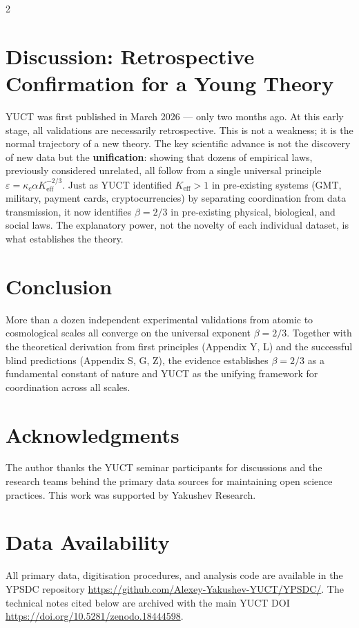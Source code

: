 \documentclass[11pt,a4paper]{article}
\newcommand{\betaf}{\beta}
\begin{document}
\begin{multicols}{2}
		\section{Discussion: Retrospective Confirmation for a Young Theory}
		
		YUCT was first published in March 2026 — only two months ago. At this early stage, all validations are necessarily retrospective. This is not a weakness; it is the normal trajectory of a new theory. The key scientific advance is not the discovery of new data but the \textbf{unification}: showing that dozens of empirical laws, previously considered unrelated, all follow from a single universal principle \(\varepsilon = \kappa_c \alpha K_{\mathrm{eff}}^{-2/3}\). Just as YUCT identified \(K_{\mathrm{eff}} > 1\) in pre‑existing systems (GMT, military, payment cards, cryptocurrencies) by separating coordination from data transmission, it now identifies \(\beta = 2/3\) in pre‑existing physical, biological, and social laws. The explanatory power, not the novelty of each individual dataset, is what establishes the theory.
		
		\section{Conclusion}
		
		More than a dozen independent experimental validations from atomic to cosmological scales all converge on the universal exponent \(\betaf = 2/3\). Together with the theoretical derivation from first principles (Appendix Y, L) and the successful blind predictions (Appendix S, G, Z), the evidence establishes \(\betaf = 2/3\) as a fundamental constant of nature and YUCT as the unifying framework for coordination across all scales.
		
		\section*{Acknowledgments}
		
		The author thanks the YUCT seminar participants for discussions and the research teams behind the primary data sources for maintaining open science practices. This work was supported by Yakushev Research.
		
		\section*{Data Availability}
		
		All primary data, digitisation procedures, and analysis code are available in the YPSDC repository \url{https://github.com/Alexey-Yakushev-YUCT/YPSDC/}. The technical notes cited below are archived with the main YUCT DOI \url{https://doi.org/10.5281/zenodo.18444598}.
		

\end{multicols}
\end{document}
